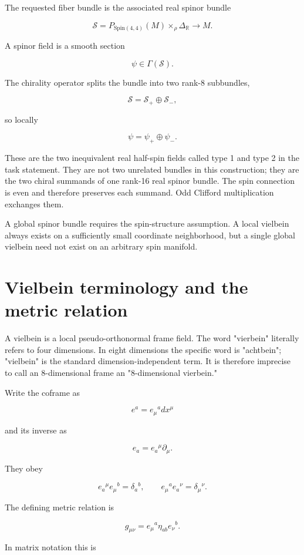 \documentclass[11pt]{article}
\begin{document}
The requested fiber bundle is the associated real spinor bundle

\[
\boxed{
\mathcal S=P_{\mathrm{Spin}(4,4)}(M)
\mathbin{\times}_{\rho}\Delta_{\mathbb R}
\longrightarrow M.}
\]

A spinor field is a smooth section

\[
\psi\in\Gamma(\mathcal S).
\]

The chirality operator splits the bundle into two rank-8 subbundles,

\[
\mathcal S=\mathcal S_+\oplus\mathcal S_-,
\]

so locally

\[
\psi=\psi_+\oplus\psi_-.
\]

These are the two inequivalent real half-spin fields called type 1 and type 2 in the task statement. They are not two unrelated bundles in this construction; they are the two chiral summands of one rank-16 real spinor bundle. The spin connection is even and therefore preserves each summand. Odd Clifford multiplication exchanges them.

A global spinor bundle requires the spin-structure assumption. A local vielbein always exists on a sufficiently small coordinate neighborhood, but a single global vielbein need not exist on an arbitrary spin manifold.

\section{Vielbein terminology and the metric relation}

A vielbein is a local pseudo-orthonormal frame field. The word "vierbein" literally refers to four dimensions. In eight dimensions the specific word is "achtbein"; "vielbein" is the standard dimension-independent term. It is therefore imprecise to call an 8-dimensional frame an "8-dimensional vierbein."

Write the coframe as

\[
e^a=e_\mu{}^a dx^\mu
\]

and its inverse as

\[
e_a=e_a{}^\mu\partial_\mu.
\]

They obey

\[
e_a{}^\mu e_\mu{}^b=\delta_a{}^b,
\qquad
e_\mu{}^a e_a{}^\nu=\delta_\mu{}^\nu.
\]

The defining metric relation is

\[
\boxed{g_{\mu\nu}=e_\mu{}^a\eta_{ab}e_\nu{}^b.}
\]

In matrix notation this is
\end{document}
